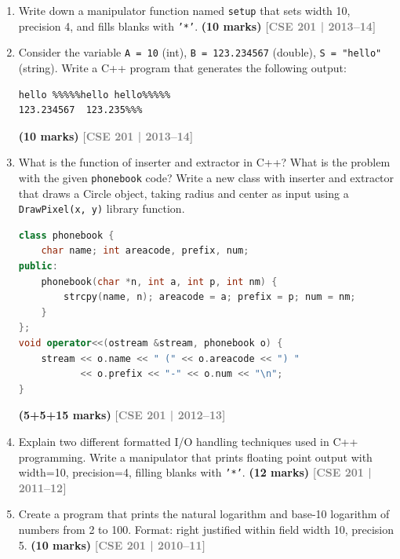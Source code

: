 \documentclass[12pt,a3paper]{article}
\newcommand{\yr}[1]{\hfill\textcolor{gray}{\small\textbf{[#1]}}}
\newcommand{\mk}[1]{\textcolor{orange!70!black}{\small\textbf{(#1 marks)}}}
\begin{document}
\begin{enumerate}
\item Write down a manipulator function named \texttt{setup} that sets width 10, precision 4, and fills blanks with \texttt{'*'}. \mk{10}
\yr{CSE 201 | 2013--14}



\item Consider the variable \texttt{A = 10} (int), \texttt{B = 123.234567} (double), \texttt{S = "hello"} (string). Write a C++ program that generates the following output:
\begin{verbatim}
hello %%%%%hello hello%%%%%
123.234567  123.235%%%
\end{verbatim}
\mk{10}
\yr{CSE 201 | 2013--14}




\item What is the function of inserter and extractor in C++? What is the problem with the given \texttt{phonebook} code? Write a new class with inserter and extractor that draws a Circle object, taking radius and center as input using a \texttt{DrawPixel(x, y)} library function.
\begin{lstlisting}[language=C++]
class phonebook {
    char name; int areacode, prefix, num;
public:
    phonebook(char *n, int a, int p, int nm) {
        strcpy(name, n); areacode = a; prefix = p; num = nm;
    }
};
void operator<<(ostream &stream, phonebook o) {
    stream << o.name << " (" << o.areacode << ") "
           << o.prefix << "-" << o.num << "\n";
}
\end{lstlisting}
\mk{5+5+15}
\yr{CSE 201 | 2012--13}




\item Explain two different formatted I/O handling techniques used in C++ programming. Write a manipulator that prints floating point output with width=10, precision=4, filling blanks with \texttt{'*'}. \mk{12}
\yr{CSE 201 | 2011--12}





\item Create a program that prints the natural logarithm and base-10 logarithm of numbers from 2 to 100. Format: right justified within field width 10, precision 5. \mk{10}
\yr{CSE 201 | 2010--11}




\end{enumerate}
\end{document}
